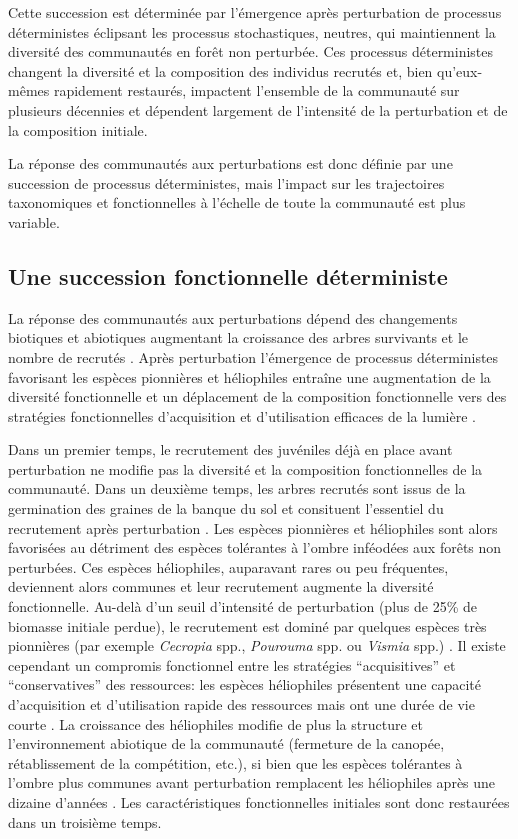 \documentclass[
  11pt,
  french,
  A4paper,
  extrafontsizes,onecolumn,openright
  ]{memoir}
\begin{document}
Cette succession est déterminée par l'émergence après perturbation de
processus déterministes éclipsant les processus stochastiques, neutres,
qui maintiennent la diversité des communautés en forêt non perturbée.
Ces processus déterministes changent la diversité et la composition des
individus recrutés et, bien qu'eux-mêmes rapidement restaurés, impactent
l'ensemble de la communauté sur plusieurs décennies et dépendent
largement de l'intensité de la perturbation et de la composition
initiale.

La réponse des communautés aux perturbations est donc définie par une
succession de processus déterministes, mais l'impact sur les
trajectoires taxonomiques et fonctionnelles à l'échelle de toute la
communauté est plus variable.

\subsection{Une succession fonctionnelle
déterministe}\label{une-succession-fonctionnelle-deterministe}

La réponse des communautés aux perturbations dépend des changements
biotiques et abiotiques augmentant la croissance des arbres survivants
et le nombre de recrutés \autocite{Piponiot2016}. Après perturbation
l'émergence de processus déterministes favorisant les espèces pionnières
et héliophiles entraîne une augmentation de la diversité fonctionnelle
et un déplacement de la composition fonctionnelle vers des stratégies
fonctionnelles d'acquisition et d'utilisation efficaces de la lumière
\autocites{Violle2007b}{Baraloto2012}.

Dans un premier temps, le recrutement des juvéniles déjà en place avant
perturbation ne modifie pas la diversité et la composition
fonctionnelles de la communauté. Dans un deuxième temps, les arbres
recrutés sont issus de la germination des graines de la banque du sol et
consituent l'essentiel du recrutement après perturbation
\autocite{Lawton1988}. Les espèces pionnières et héliophiles sont alors
favorisées au détriment des espèces tolérantes à l'ombre inféodées aux
forêts non perturbées. Ces espèces héliophiles, auparavant rares ou peu
fréquentes, deviennent alors communes et leur recrutement augmente la
diversité fonctionnelle. Au-delà d'un seuil d'intensité de perturbation
(plus de 25\% de biomasse initiale perdue), le recrutement est dominé
par quelques espèces très pionnières (par exemple \emph{Cecropia} spp.,
\emph{Pourouma} spp. ou \emph{Vismia} spp.) \autocite{Guitet2018}. Il
existe cependant un compromis fonctionnel entre les stratégies
``acquisitives'' et ``conservatives'' des ressources: les espèces
héliophiles présentent une capacité d'acquisition et d'utilisation
rapide des ressources mais ont une durée de vie courte
\autocite{Falster2011}. La croissance des héliophiles modifie de plus la
structure et l'environnement abiotique de la communauté (fermeture de la
canopée, rétablissement de la compétition, etc.), si bien que les
espèces tolérantes à l'ombre plus communes avant perturbation remplacent
les héliophiles après une dizaine d'années \autocite{Denslow2000}. Les
caractéristiques fonctionnelles initiales sont donc restaurées dans un
troisième temps.
\end{document}
